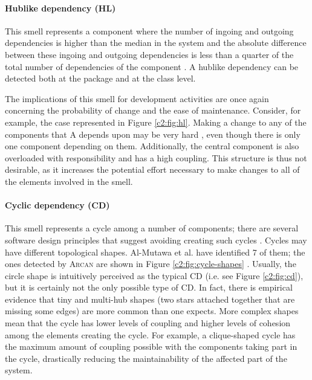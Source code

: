 \paragraph{Hublike dependency (HL)}\label{c2:sec:arch-smells-hl}
This smell represents a component where the number of ingoing and outgoing dependencies is higher than the median in the system and the absolute difference between these ingoing and outgoing dependencies is less than a quarter of the total number of dependencies of the component \cite{Arcelli2016}. A hublike dependency can be detected both at the package and at the class level.

The implications of this smell for development activities are once again concerning the probability of change and the ease of maintenance. Consider, for example, the case represented in Figure \ref{c2:fig:hl}.
Making a change to any of the components that A depends upon may be very hard \cite{Martin2018}, even though there is only one component depending on them.
Additionally, the central component is also overloaded with responsibility and has a high coupling.
This structure is thus not desirable, as it increases the potential effort necessary to make changes to all of the elements involved in the smell.

\paragraph{Cyclic dependency (CD)}\label{c2:sec:arch-smells-cd}
This smell represents a cycle among a number of components; there are several software design principles that suggest avoiding creating such cycles \cite{Lippert2006,Parnas1979,Stevens1974,Martin2018}.
Cycles may have different topological shapes. Al-Mutawa et al. \cite{AlMutawa2014} have identified 7 of them; the ones detected by \textsc{Arcan} are shown in Figure \ref{c2:fig:cycle-shapes} \cite{Arcelli2017}.
Usually, the circle shape is intuitively perceived as the typical CD (i.e. see Figure \ref{c2:fig:cd}), but it is certainly not the only possible type of CD. In fact, there is empirical evidence \cite{AlMutawa2014} that tiny and multi-hub shapes (two stars attached together that are missing some edges) are more common than one expects.
More complex shapes mean that the cycle has lower levels of coupling and higher levels of cohesion among the elements creating the cycle.
For example, a clique-shaped cycle has the maximum amount of coupling possible with the components taking part in the cycle, drastically reducing the maintainability of the affected part of the system.

